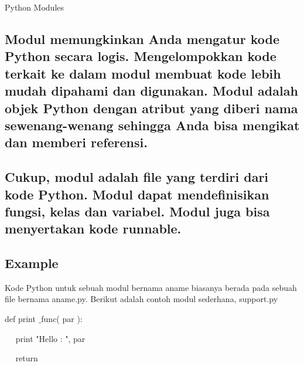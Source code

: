 \documentclass[a4paper,12pt]{report}
\begin{document}
\sloppy
\begin{center}{\fontsize{24pt}{24pt}\selectfont Python Modules \\}\end{center} \par
\vspace{12pt}
\subsection*{Modul memungkinkan Anda mengatur kode Python secara logis. Mengelompokkan kode terkait ke dalam modul membuat kode lebih mudah dipahami dan digunakan. Modul adalah objek Python dengan atribut yang diberi nama sewenang-wenang sehingga Anda bisa mengikat dan memberi referensi.}
 \par
\subsection*{Cukup, modul adalah file yang terdiri dari kode Python. Modul dapat mendefinisikan fungsi, kelas dan variabel. Modul juga bisa menyertakan kode runnable.}
 \par
\vspace{12pt}
\subsection*{Example}
 \par
\begin{adjustwidth}{0.03in}{0.03in}
Kode Python untuk sebuah modul bernama aname biasanya berada pada sebuah file bernama aname.py. Berikut adalah contoh modul sederhana, support.py\end{adjustwidth}
 \par
\noindent 
 \hspace*{0.5in} def print $  \_  $func( par ): \par
\noindent 
 \hspace*{0.5in} ~~ print "Hello : ", par \par
\noindent 
 \hspace*{0.5in} ~~ return \par
\vspace{20pt}
\end{document}
